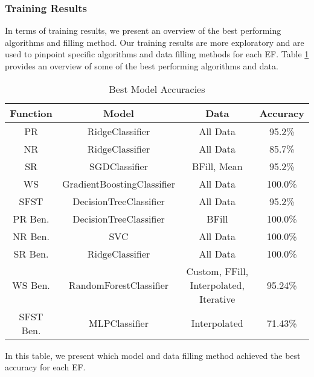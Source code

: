 \documentclass[12pt,letterpaper]{article}
\begin{document}
\subsubsection{Training Results}
In terms of training results, we present an overview of the best performing algorithms and filling method.
Our training results are more exploratory and are used to pinpoint specific algorithms and data filling methods for each \ac{EF}.
Table \ref{tab_class:spec_model_accuracies_best} provides an overview of some of the best performing algorithms and data.


\begin{table}[H]
\centering
\begin{tabular}{|c|c|c|c|}
\hline
\textbf{Function} & \textbf{Model} & \textbf{Data} & \textbf{Accuracy} \\
\hline

PR & RidgeClassifier & All Data & 95.2\% \\
\hline
NR & RidgeClassifier & All Data & 85.7\% \\
\hline
SR & SGDClassifier & BFill, Mean & 95.2\% \\
\hline
WS & GradientBoostingClassifier & All Data & 100.0\% \\
\hline
SFST & DecisionTreeClassifier & All Data & 95.2\% \\
\hline
PR Ben. & DecisionTreeClassifier & BFill & 100.0\% \\
\hline
NR Ben. & SVC & All Data & 100.0\% \\
\hline
SR Ben. & RidgeClassifier & All Data & 100.0\% \\
\hline
WS Ben. & RandomForestClassifier & Custom, FFill, Interpolated, Iterative & 95.24\% \\
\hline
SFST Ben. & MLPClassifier & Interpolated & 71.43\% \\
\hline

\end{tabular}
\caption{Best Model Accuracies}
\label{tab_class:spec_model_accuracies_best}
\end{table}

In this table, we present which model and data filling method achieved the best accuracy for each \ac{EF}.
\end{document}
